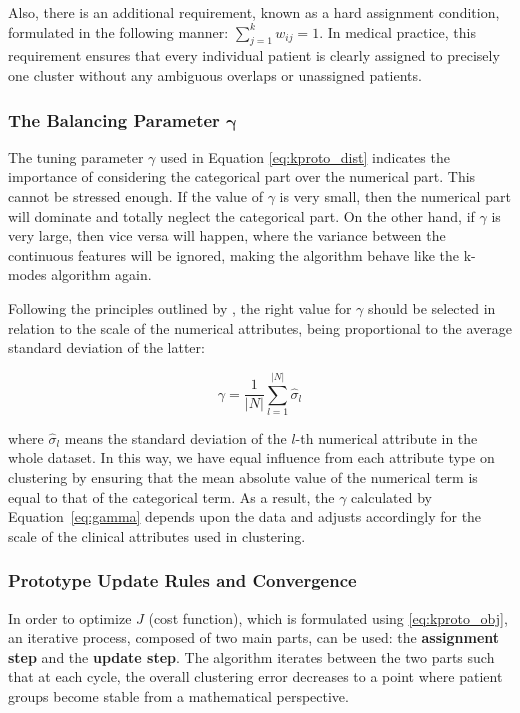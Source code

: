 Also, there is an additional requirement, known as a hard assignment condition, formulated in the following manner: $\sum_{j=1}^k w_{ij}=1$. In medical practice, this requirement ensures that every individual patient is clearly assigned to precisely one cluster without any ambiguous overlaps or unassigned patients.

\subsubsection*{The Balancing Parameter $\boldsymbol{\gamma}$}

The tuning parameter $\gamma$ used in Equation \ref{eq:kproto_dist} indicates the importance of considering the categorical part over the numerical part. This cannot be stressed enough. If the value of $\gamma$ is very small, then the numerical part will dominate and totally neglect the categorical part. On the other hand, if $\gamma$ is very large, then vice versa will happen, where the variance between the continuous features will be ignored, making the algorithm behave like the k-modes algorithm again.

Following the principles outlined by \cite{huang1998}, the right value for $\gamma$ should be selected in relation to the scale of the numerical attributes, being proportional to the average standard deviation of the latter:

\begin{equation}
    \gamma = \frac{1}{|N|} \sum_{l=1}^{|N|} \hat{\sigma}_l
    \label{eq:gamma}
\end{equation}

where $\hat{\sigma}_l$ means the standard deviation of the $l$-th numerical attribute in the whole dataset. In this way, we have equal influence from each attribute type on clustering by ensuring that the mean absolute value of the numerical term is equal to that of the categorical term. As a result, the $\gamma$ calculated by Equation~\eqref{eq:gamma} depends upon the data and adjusts accordingly for the scale of the clinical attributes used in clustering.

\subsubsection*{Prototype Update Rules and Convergence}

In order to optimize $J$ (cost function), which is formulated using \eqref{eq:kproto_obj}, an iterative process, composed of two main parts, can be used: the \textbf{assignment step} and the \textbf{update step}. The algorithm iterates between the two parts such that at each cycle, the overall clustering error decreases to a point where patient groups become stable from a mathematical perspective.

